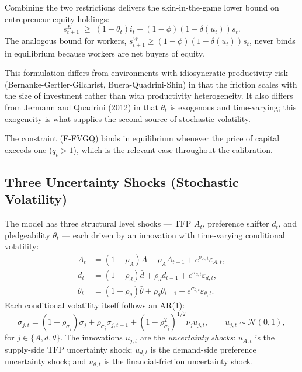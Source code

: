 \documentclass[11pt]{article}
\newcommand{\mc}[1]{\mathcal{#1}}
\newcommand{\sigA}{\sigma_{A,t}}
\newcommand{\sigd}{\sigma_{d,t}}
\newcommand{\sE}{s^E_{t+1}}
\newcommand{\sW}{s^W_{t+1}}
\theoremstyle{plain}
\theoremstyle{definition}
\begin{document}
Combining the two restrictions delivers the skin-in-the-game lower bound on
entrepreneur equity holdings:
\begin{equation}
\sE \;\ge\; (1-\theta_t) i_t + (1-\phi) (1-\delta(u_t)) s_t.
\tag{F-FVGQ}
\end{equation}
The analogous bound for workers,
$\sW \ge (1-\phi)(1-\delta(u_t)) s_t$, never binds in equilibrium because
workers are net buyers of equity.

This formulation differs from environments with idiosyncratic productivity
risk (Bernanke-Gertler-Gilchrist, Buera-Quadrini-Shin) in that the friction
scales with the size of investment rather than with productivity heterogeneity.
It also differs from Jermann and Quadrini (2012) in that $\theta_t$ is exogenous
and time-varying; this exogeneity is what supplies the second source of
stochastic volatility.

The constraint (F-FVGQ) binds in equilibrium whenever the price of capital
exceeds one ($q_t>1$), which is the relevant case throughout the
calibration.

\subsection{Three Uncertainty Shocks (Stochastic Volatility)}
\label{subsec:fvgq-uncertainty}

The model has three structural level shocks --- TFP $A_t$, preference shifter
$d_t$, and pledgeability $\theta_t$ --- each driven by an innovation with
time-varying conditional volatility:
\begin{align}
A_t &= (1-\rho_A) \bar A + \rho_A A_{t-1} + e^{\sigA} \varepsilon_{A,t},
\tag{Lvl-A}\\
d_t &= (1-\rho_d) \bar d + \rho_d d_{t-1} + e^{\sigd} \varepsilon_{d,t},
\tag{Lvl-d}\\
\theta_t &= (1-\rho_\theta) \bar\theta + \rho_\theta \theta_{t-1}
+ e^{\sigma_{\theta,t}} \varepsilon_{\theta,t}.
\tag{Lvl-$\theta$}
\end{align}
Each conditional volatility itself follows an AR(1):
\begin{equation}
\sigma_{j,t} = (1-\rho_{\sigma_j}) \sigma_j + \rho_{\sigma_j} \sigma_{j,t-1}
+ (1-\rho_{\sigma_j}^2)^{1/2} \nu_j u_{j,t},
\qquad
u_{j,t} \sim \mc{N}(0,1),
\tag{SV-$j$}
\end{equation}
for $j \in \{A, d, \theta\}$. The innovations $u_{j,t}$ are the
\emph{uncertainty shocks}: $u_{A,t}$ is the supply-side TFP uncertainty
shock; $u_{d,t}$ is the demand-side preference uncertainty shock; and
$u_{\theta,t}$ is the financial-friction uncertainty shock.
\end{document}

